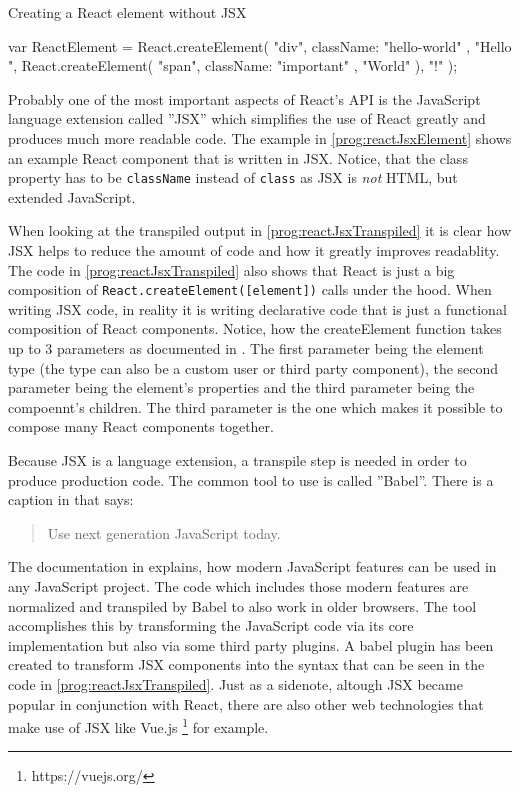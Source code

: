 \begin{program}
\caption{Creating a React element without JSX} 
\label{prog:reactJsxTranspiled}
\begin{JsCode}
var ReactElement = React.createElement(
  "div", 
  { className: "hello-world" }, 
  "Hello ", 
  React.createElement(
    "span", 
    { className: "important" }, 
    "World"
  ), 
  "!"
);
\end{JsCode}
\end{program}

Probably one of the most important aspects of React's API is the JavaScript language extension called ''JSX'' which simplifies the use of React greatly and produces much more readable code. The example in \ref{prog:reactJsxElement} shows an example React component that is written in JSX. Notice, that the class property has to be \texttt{className} instead of \texttt{class} as JSX is \emph{not} HTML, but extended JavaScript.

When looking at the transpiled output in \ref{prog:reactJsxTranspiled} it is clear how JSX helps to reduce the amount of code and how it greatly improves readablity. The code in \ref{prog:reactJsxTranspiled} also shows that React is just a big composition of \texttt{React.createElement([element])} calls under the hood. When writing JSX code, in reality it is writing declarative code that is just a functional composition of React components. Notice, how the createElement function takes up to 3 parameters as documented in \cite[/docs/react-api.html]{React}. The first parameter being the element type (the type can also be a custom user or third party component), the second parameter being the element's properties and the third parameter being the compoennt's children. The third parameter is the one which makes it possible to compose many React components together.

Because JSX is a language extension, a transpile step is needed in order to produce production code. The common tool to use is called ''Babel''. There is a caption in \cite{Babel} that says: \begin{quote}\begin{english}Use next generation JavaScript today.\end{english}\end{quote} The documentation in \cite[/docs/en]{Babel} explains, how modern JavaScript features can be used in any JavaScript project. The code which includes those modern features are normalized and transpiled by Babel to also work in older browsers. The tool accomplishes this by transforming the JavaScript code via its core implementation but also via some third party plugins. A babel plugin has been created to transform JSX components into the syntax that can be seen in the code in \ref{prog:reactJsxTranspiled}. Just as a sidenote, altough JSX became popular in conjunction with React, there are also other web technologies that make use of JSX like Vue.js \footnote{https://vuejs.org/} for example.


